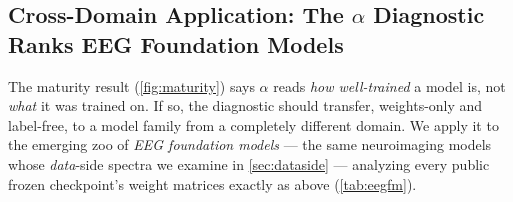 
\newcommand{\EeNmodels}{six}
\newcommand{\EeBendrParams}{157}       %
\newcommand{\EeBendrAlpha}{2.10}
\newcommand{\EeBendrUnder}{68}         %
\newcommand{\EeLabramParams}{5.8}      %
\newcommand{\EeLabramHealthy}{94}      %
\newcommand{\EeReveParams}{69}
\newcommand{\EeZunaParams}{382}        %
\newcommand{\EeZunaAlpha}{2.29}

\subsection{Cross-Domain Application: The $\alpha$ Diagnostic Ranks EEG Foundation Models}
\label{sec:eegfm}

The maturity result (\cref{fig:maturity}) says $\alpha$ reads \emph{how well-trained} a model is, not
\emph{what} it was trained on. If so, the diagnostic should transfer, weights-only and label-free, to a
model family from a completely different domain. We apply it to the emerging zoo of \emph{EEG foundation
models} --- the same neuroimaging models whose \emph{data}-side spectra we examine in \cref{sec:dataside}
--- analyzing every public frozen checkpoint's weight matrices exactly as above (\cref{tab:eegfm}).

